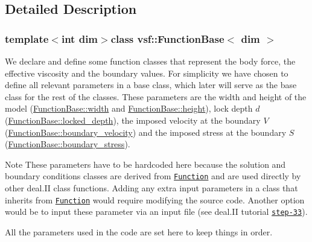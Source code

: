 \subsection{Detailed Description}
\subsubsection*{template$<$int dim$>$class vsf\-::\-Function\-Base$<$ dim $>$}

We declare and define some function classes that represent the body force, the effective viscosity and the boundary values. For simplicity we have chosen to define all relevant parameters in a base class, which later will serve as the base class for the rest of the classes. These parameters are the width and height of the model (\hyperlink{classvsf_1_1FunctionBase_ad2bf6791357d301b7d838b6188ef646e}{Function\-Base\-::width} and \hyperlink{classvsf_1_1FunctionBase_acfffb54eadb79217d150a73e3797b25a}{Function\-Base\-::height}), lock depth $d$ (\hyperlink{classvsf_1_1FunctionBase_ae06ffa81ca26e9ead535d50596d852c1}{Function\-Base\-::locked\-\_\-depth}), the imposed velocity at the boundary $V$ (\hyperlink{classvsf_1_1FunctionBase_ae2bc27d347d942067f178bb02006ec44}{Function\-Base\-::boundary\-\_\-velocity}) and the imposed stress at the boundary $S$ (\hyperlink{classvsf_1_1FunctionBase_a342cfaf03d11de71ca34234f48e8825e}{Function\-Base\-::boundary\-\_\-stress}).

\begin{DoxyNote}{Note}
These parameters have to be hardcoded here because the solution and boundary conditions classes are derived from \href{https://www.dealii.org/8.2.0/doxygen/deal.II/classFunction.html}{\tt Function} and are used directly by other deal.\-I\-I class functions. Adding any extra input parameters in a class that inherits from \href{https://www.dealii.org/8.2.0/doxygen/deal.II/classFunction.html}{\tt Function} would require modifying the source code. Another option would be to input these parameter via an input file (see deal.\-I\-I tutorial \href{https://www.dealii.org/8.2.0/doxygen/deal.II/step_33.html}{\tt step-\/33}).
\end{DoxyNote}
All the parameters used in the code are set here to keep things in order. 

